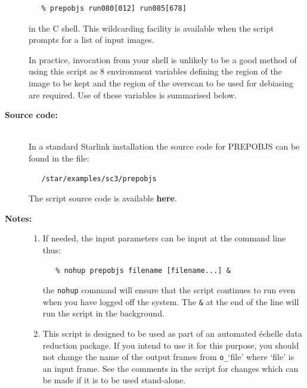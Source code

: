 \documentclass[twoside,11pt]{article}
\newcommand{\htmlref}[2]{#1}
\newenvironment{latexonly}{}{}
\renewcommand{\_}{\texttt{\symbol{95}}}
\begin{document}
\begin{description}
\begin{verbatim}
   % prepobjs run080[012] run085[678]
\end{verbatim}

     in the C shell.  This wildcarding facility is available when the
     script prompts for a list of input images.

     In practice, invocation from your shell is unlikely to be a good
     method of using this script as 8 environment variables defining
     the region of the image to be kept and the region of the overscan
     to be used for debiasing are required.  Use of these variables is
     summarised below.

\item [{\bf Source code:}] \mbox{} \\
\begin{latexonly}
In a standard Starlink installation the source code for PREPOBJS can be found
in the file:
\begin{verbatim}
   /star/examples/sc3/prepobjs
\end{verbatim}
\end{latexonly}
\begin{htmlonly}
      The script source code is available
      \htmlref{{\bf here}}{se_prepobjs_source}.
\end{htmlonly}

\item [{\bf Notes:}] \mbox{}
\begin{enumerate}

\item If needed, the input parameters can be input at the command
      line thus:

\begin{verbatim}
   % nohup prepobjs filename [filename...] &
\end{verbatim}

      the \verb+nohup+ command will ensure that the script continues
      to run even when you have logged off the system.  The \verb+&+ at
      the end of the line will run the script in the background.

\item This script is designed to be used as part of an automated
      \'{e}chelle data reduction package.  If you intend to use it
      for this purpose, you should not change the name of the output
      frames from \verb+o_+`file' where `file' is an input frame.  See the
      comments in the script for changes which can be made if it is
      to be used stand-alone.


\end{enumerate}
\end{description}
\end{document}
